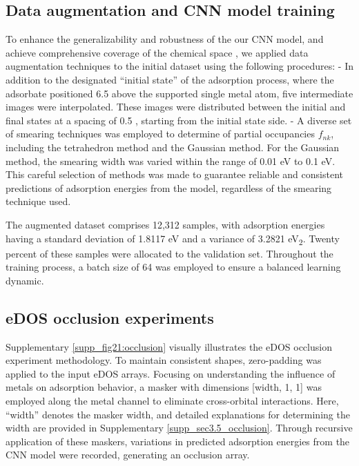 \documentclass[a4paper, 12pt, titlepage]{article}
\begin{document}
    \subsection{Data augmentation and CNN model training}
    To enhance the generalizability and robustness of the our CNN model, and achieve comprehensive coverage of the chemical space \cite{DBLP:journals/corr/abs-2112-12542}, we applied data augmentation techniques to the initial dataset using the following procedures:
        - In addition to the designated ``initial state'' of the adsorption process, where the adsorbate positioned 6.5 \text{\AA} above the supported single metal atom, five intermediate images were interpolated. These images were distributed between the initial and final states at a spacing of 0.5 \text{\AA}, starting from the initial state side.
        - A diverse set of smearing techniques was employed to determine of partial occupancies $f_{nk}$, including the tetrahedron method \cite{blochl1994improved} and the Gaussian method. For the Gaussian method, the smearing width was varied within the range of 0.01 eV to 0.1 eV. This careful selection of methods was made to guarantee reliable and consistent predictions of adsorption energies from the model, regardless of the smearing technique used.

    The augmented dataset comprises 12,312 samples, with adsorption energies having a standard deviation of 1.8117 eV and a variance of 3.2821 eV\textsubscript{2}.
    Twenty percent of these samples were allocated to the validation set. Throughout the training process, a batch size of 64 was employed to ensure a balanced learning dynamic.


    \subsection{eDOS occlusion experiments}
    Supplementary \cref{supp_fig21:occlusion} visually illustrates the eDOS occlusion experiment methodology.
    To maintain consistent shapes, zero-padding was applied to the input eDOS arrays.
    Focusing on understanding the influence of metals on adsorption behavior,
    a masker with dimensions [width, 1, 1] was employed along the metal channel
    to eliminate cross-orbital interactions.
    Here, ``width'' denotes the masker width, and detailed explanations for determining the width
    are provided in Supplementary \cref{supp_sec3.5_occlusion}.
    Through recursive application of these maskers, variations in predicted adsorption energies from the CNN model were recorded, generating an occlusion array.
\end{document}
